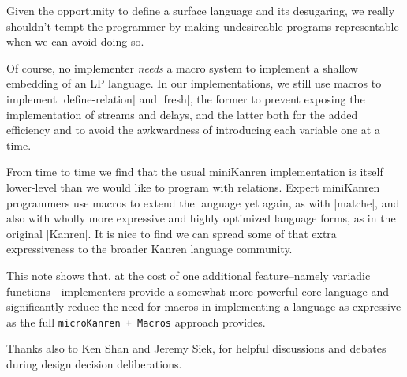 \documentclass[sigplan,screen,draft,anonymous,review,natbib=false]{acmart}
\begin{document}
Given the opportunity to define a surface language and its desugaring,
we really shouldn't tempt the programmer by making undesireable
programs representable when we can avoid doing so.

Of course, no implementer \emph{needs} a macro system to implement a
shallow embedding of an LP language. In our implementations, we still
use macros to implement \rackinline|define-relation| and
\rackinline|fresh|, the former to prevent exposing the implementation
of streams and delays, and the latter both for the added efficiency
and to avoid the awkwardness of introducing each variable one at a
time.

From time to time we find that the usual miniKanren implementation is
itself lower-level than we would like to program with relations.
Expert miniKanren programmers use macros to extend the language yet
again, as with \rackinline|matche|, and also with wholly more
expressive and highly optimized language forms, as in the original
\rackinline|Kanren|. It is nice to find we can spread some of that
extra expressiveness to the broader Kanren language community.

This note shows that, at the cost of one additional feature--namely
variadic functions---implementers provide a somewhat more powerful
core language and significantly reduce the need for macros in
implementing a language as expressive as the full
\verb|microKanren + Macros| approach provides.

\begin{acks}

Thanks also to Ken Shan and Jeremy Siek, for helpful discussions and
debates during design decision deliberations.

\end{acks}

\printbibliography{}
\end{document}
